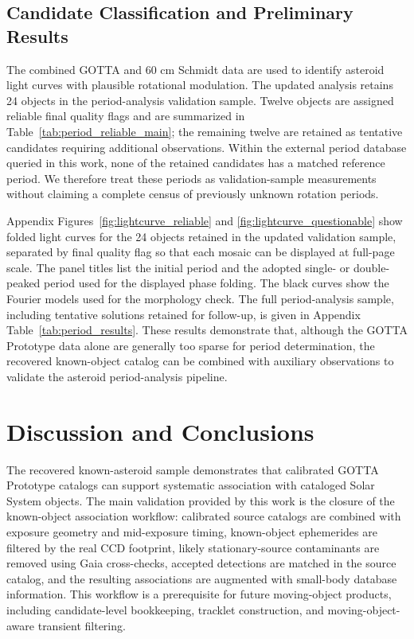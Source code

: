 \documentclass[referee]{raa}
\begin{document}
\subsection{Candidate Classification and Preliminary Results}

The combined GOTTA and 60 cm Schmidt data are used to identify asteroid light curves with plausible rotational modulation. The updated analysis retains 24 objects in the period-analysis validation sample. Twelve objects are assigned reliable final quality flags and are summarized in Table~\ref{tab:period_reliable_main}; the remaining twelve are retained as tentative candidates requiring additional observations. Within the external period database queried in this work, none of the retained candidates has a matched reference period. We therefore treat these periods as validation-sample measurements without claiming a complete census of previously unknown rotation periods.



Appendix Figures~\ref{fig:lightcurve_reliable} and \ref{fig:lightcurve_questionable} show folded light curves for the 24 objects retained in the updated validation sample, separated by final quality flag so that each mosaic can be displayed at full-page scale. The panel titles list the initial period and the adopted single- or double-peaked period used for the displayed phase folding. The black curves show the Fourier models used for the morphology check. The full period-analysis sample, including tentative solutions retained for follow-up, is given in Appendix Table~\ref{tab:period_results}. These results demonstrate that, although the GOTTA Prototype data alone are generally too sparse for period determination, the recovered known-object catalog can be combined with auxiliary observations to validate the asteroid period-analysis pipeline.

\FloatBarrier

\section{Discussion and Conclusions}
\label{sec:discussion}

The recovered known-asteroid sample demonstrates that calibrated GOTTA Prototype catalogs can support systematic association with cataloged Solar System objects. The main validation provided by this work is the closure of the known-object association workflow: calibrated source catalogs are combined with exposure geometry and mid-exposure timing, known-object ephemerides are filtered by the real CCD footprint, likely stationary-source contaminants are removed using Gaia cross-checks, accepted detections are matched in the source catalog, and the resulting associations are augmented with small-body database information. This workflow is a prerequisite for future moving-object products, including candidate-level bookkeeping, tracklet construction, and moving-object-aware transient filtering.
\end{document}

